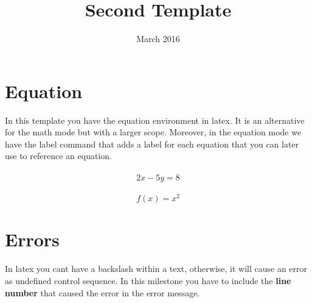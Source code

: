 \documentclass{article}
\begin{document}
\title{Second Template}
\date{March 2016}
\maketitle


\section{Equation}
In this template you have the equation environment in latex. It is an alternative for the math mode but with a larger scope. Moreover, in the equation mode we have the label command that adds a label for each equation that you can later use to reference an equation. \\
\\
\begin{equation}
\label{eq1}
2x-5y=8
\end{equation}
\\
\begin{equation}
\label{eq2}
f(x)=x^2
\end{equation}



\section{Errors}
In latex you cant have a backslash within a text, otherwise, it will cause an error as undefined control sequence. In this milestone you have to include the \textbf{line number} that caused the error in the error message. \errorcoming
\end{document}
